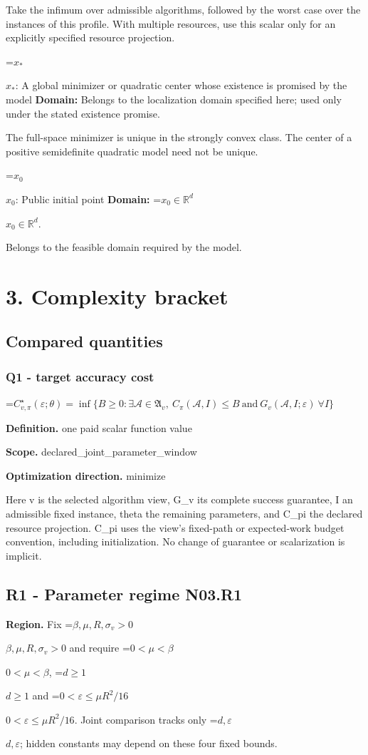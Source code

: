 \documentclass[10pt,a4paper]{article}
\newcommand{\AtlasMath}[1]{\par\begingroup\centering\setbox0=\hbox{$\displaystyle #1$}\ifdim\wd0>1.4\linewidth\typeout{ATLAS WIDE FORMULA: \the\wd0}\fi\ifdim\wd0>\linewidth\resizebox{\linewidth}{!}{\box0}\else\box0\fi\par\endgroup}
\newcommand{\AtlasInlineMath}[1]{\begingroup\setbox0=\hbox{$#1$}\ifdim\wd0>.4\linewidth\endgroup\AtlasMath{#1}\else\endgroup$#1$\fi}
\begin{document}
Take the infimum over admissible algorithms, followed by the worst case over the instances of this profile. With multiple resources, use this scalar only for an explicitly specified resource projection.

\AtlasInlineMath{x_*}: A global minimizer or quadratic center whose existence is promised by the model \textbf{Domain:} Belongs to the localization domain specified here; used only under the stated existence promise.

The full-space minimizer is unique in the strongly convex class. The center of a positive semidefinite quadratic model need not be unique.

\AtlasInlineMath{x_0}: Public initial point \textbf{Domain:} \AtlasInlineMath{x_0\in\mathbb{R}^d}.

Belongs to the feasible domain required by the model.

\section{3. Complexity bracket}
\subsection{Compared quantities}
\subsubsection{Q1 - target accuracy cost}
\AtlasMath{C^\star_{v,\pi}(\varepsilon;\theta)=\inf\{B\ge0:\exists\mathcal A\in\mathfrak A_v,\ C_\pi(\mathcal A,I)\le B\ \text{and}\ G_v(\mathcal A,I;\varepsilon)\ \forall I\}}
\textbf{Definition.} one paid scalar function value

\textbf{Scope.} declared\_joint\_parameter\_window

\textbf{Optimization direction.} minimize

Here v is the selected algorithm view, G\_v its complete success guarantee, I an admissible fixed instance, theta the remaining parameters, and C\_pi the declared resource projection. C\_pi uses the view's fixed-path or expected-work budget convention, including initialization. No change of guarantee or scalarization is implicit.

\subsection{R1 - Parameter regime N03.R1}
\textbf{Region.} Fix \AtlasInlineMath{\beta,\mu,R,\sigma_v>0} and require \AtlasInlineMath{0<\mu<\beta}, \AtlasInlineMath{d\ge1} and \AtlasInlineMath{0<\varepsilon\le\mu R^2/16}. Joint comparison tracks only \AtlasInlineMath{d,\varepsilon}; hidden constants may depend on these four fixed bounds.
\end{document}
